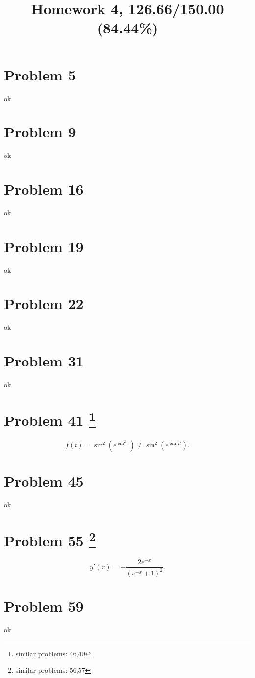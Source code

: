 \documentclass[10pt]{article} %
\title{Homework 4,
126.66/150.00 (84.44\%)
}
\begin{document}
\maketitle

\section*{Problem 5 }
ok

\section*{Problem 9 }
ok

\section*{Problem 16 }
ok

\section*{Problem 19 }
ok
\section*{Problem 22 }
ok
\section*{Problem 31 }
ok
\section*{Problem 41 \footnote{similar problems: 46,40}}
\begin{equation*}
	f(t)=\sin^2(e^{\sin^2t})\neq\sin^2\left( e^{\sin2t} \right).
\end{equation*}
\section*{Problem 45 }
ok
\section*{Problem 55 \footnote{similar problems: 56,57}}
\begin{equation*}
	y'(x)=+\frac{2e^{-x}}{\left( e^{-x}+1 \right)^2}.
\end{equation*}
\section*{Problem 59 }
ok
\end{document}
